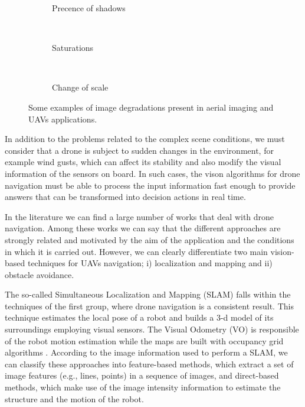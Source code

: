 \begin{figure}[!ht]
    \centering
    \begin{subfigure}[b]{0.38\textwidth}
        \caption{Precence of shadows}
    \end{subfigure}
        ~ %
    \begin{subfigure}[b]{0.38\textwidth}
        \caption{Saturations}
    \end{subfigure}
        ~ %
    \begin{subfigure}[b]{0.38\textwidth}
        \caption{Change of scale}
    \end{subfigure} 
    \caption{Some examples of image degradations present in aerial imaging and UAVs applications.}\label{fig:img_drone_degradations}
\end{figure}

In addition to the problems related to the complex scene conditions, we must consider that a drone is subject to sudden changes in the environment, for example wind gusts, which can affect its stability and also modify the visual information of the sensors on board. In such cases, the vison algorithms for drone navigation must be able to process the input information fast enough to provide answers that can be transformed into decision actions in real time.

In the literature we can find a large number of works that deal with drone navigation. Among these works we can say that the different approaches are strongly related and motivated by the aim of the application and the conditions in which it is carried out. However, we can clearly differentiate two main vision-based techniques for UAVs navigation; i) localization and mapping and ii) obstacle avoidance.

The so-called Simultaneous Localization and Mapping (SLAM) falls within the techniques of the first group, where drone navigation is a consistent result. This technique estimates the local pose of a robot and builds a 3-d model of its surroundings employing visual sensors. The Visual Odometry (VO) \citep{Scaramuzza.Fraundorfer:RAM:2011} is responsible of the robot motion estimation while the maps are built with occupancy grid algorithms \citep{Thrun.Bu:AI:1996}. According to the image information used to perform a SLAM, we can classify these approaches into feature-based methods, which extract a set of image features (e.g., lines, points) in a sequence of images, and direct-based methods, which make use of the image intensity information to estimate the structure and the motion of the robot.

